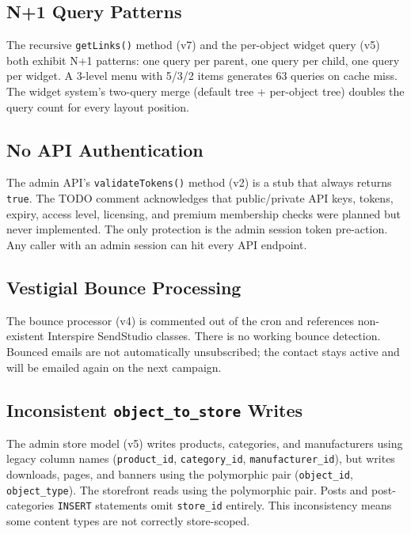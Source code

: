 \documentclass[11pt,a4paper]{article}
\begin{document}
\subsection{N+1 Query Patterns}

\begin{badbox}
The recursive \texttt{getLinks()} method (v7) and the per-object
widget query (v5) both exhibit N+1 patterns: one query per parent,
one query per child, one query per widget. A 3-level menu with 5/3/2
items generates 63 queries on cache miss. The widget system's
two-query merge (default tree + per-object tree) doubles the query
count for every layout position.
\end{badbox}

\subsection{No API Authentication}

\begin{badbox}
The admin API's \texttt{validateTokens()} method (v2) is a stub that
always returns \texttt{true}. The TODO comment acknowledges that
public/private API keys, tokens, expiry, access level, licensing, and
premium membership checks were planned but never implemented. The
only protection is the admin session token pre-action. Any caller
with an admin session can hit every API endpoint.
\end{badbox}

\subsection{Vestigial Bounce Processing}

\begin{badbox}
The bounce processor (v4) is commented out of the cron and references
non-existent Interspire SendStudio classes. There is no working
bounce detection. Bounced emails are not automatically unsubscribed;
the contact stays active and will be emailed again on the next
campaign.
\end{badbox}

\subsection{Inconsistent \texttt{object\_to\_store} Writes}

\begin{badbox}
The admin store model (v5) writes products, categories, and
manufacturers using legacy column names (\texttt{product\_id},
\texttt{category\_id}, \texttt{manufacturer\_id}), but writes
downloads, pages, and banners using the polymorphic pair
(\texttt{object\_id}, \texttt{object\_type}). The storefront reads
using the polymorphic pair. Posts and post-categories \texttt{INSERT}
statements omit \texttt{store\_id} entirely. This inconsistency means
some content types are not correctly store-scoped.
\end{badbox}
\end{document}
